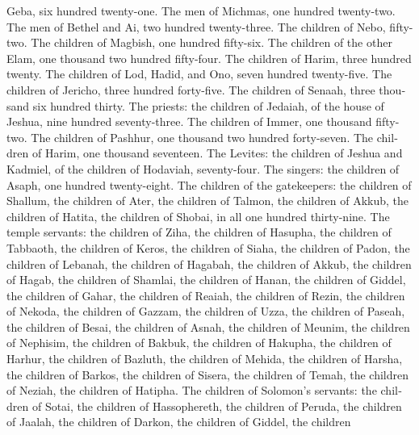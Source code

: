 \begin{paracol}{2}
\begin{otherlanguage}{english}
Geba, six hundred twenty-one.  The men of Michmas, one
hundred twenty-two.  The men of Bethel and Ai, two
hundred twenty-three.  The children of Nebo, fifty-two.
 The children of Magbish, one hundred fifty-six.
 The children of the other Elam, one thousand two hundred
fifty-four.  The children of Harim, three hundred twenty.
 The children of Lod, Hadid, and Ono, seven hundred
twenty-five.  The children of Jericho, three hundred
forty-five.  The children of Senaah, three thousand six
hundred thirty.  The priests: the children of Jedaiah, of
the house of Jeshua, nine hundred seventy-three.  The
children of Immer, one thousand fifty-two.  The children
of Pashhur, one thousand two hundred forty-seven.  The
children of Harim, one thousand seventeen.  The Levites:
the children of Jeshua and Kadmiel, of the children of Hodaviah,
seventy-four.  The singers: the children of Asaph, one
hundred twenty-eight.  The children of the gatekeepers:
the children of Shallum, the children of Ater, the children of Talmon,
the children of Akkub, the children of Hatita, the children of Shobai,
in all one hundred thirty-nine.  The temple servants: the
children of Ziha, the children of Hasupha, the children of Tabbaoth,
 the children of Keros, the children of Siaha, the
children of Padon,  the children of Lebanah, the children
of Hagabah, the children of Akkub,  the children of
Hagab, the children of Shamlai, the children of Hanan, 
the children of Giddel, the children of Gahar, the children of Reaiah,
 the children of Rezin, the children of Nekoda, the
children of Gazzam,  the children of Uzza, the children
of Paseah, the children of Besai,  the children of Asnah,
the children of Meunim, the children of Nephisim,  the
children of Bakbuk, the children of Hakupha, the children of Harhur,
 the children of Bazluth, the children of Mehida, the
children of Harsha,  the children of Barkos, the children
of Sisera, the children of Temah,  the children of
Neziah, the children of Hatipha.  The children of
Solomon's servants: the children of Sotai, the children of Hassophereth,
the children of Peruda,  the children of Jaalah, the
children of Darkon, the children of Giddel,  the children

\end{otherlanguage}
\end{paracol}
